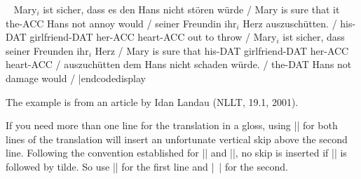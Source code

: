 \begingroup
\codedisplay~
\pex[moregloffset=1em,aboveglhangskip=1ex]\nopreamble
\def\\#1{-{\tenrm #1}}%
\a
\begingl
\gla Mary$_i$ ist sicher, dass es den Hans nicht st\"oren w\"urde /
\glb Mary is sure that it the\\{ACC} Hans not annoy would /
\moregl
\gla seiner Freundin ihr$_i$ Herz auszusch\"utten. /
\glb his\\{DAT} girlfriend\\{DAT} her\\{ACC} heart\\{ACC}
{out to throw} /
\endgl
\a
\begingl
\gla Mary$_i$ ist sicher, dass seiner Freunden ihr$_i$ Herz /
\glb Mary is sure that his\\{DAT} girlfriend\\{DAT} her\\{ACC}
heart\\{ACC} /
\moregl
\gla auszuch\"utten dem Hans nicht schaden w\"urde. /
 the\\{DAT} Hans not damage would /
\endgl
\xe |endcodedisplay
\endgroup

\noindent The example is from an article by Idan Landau (NLLT,
19.1, 2001).

If you need more than one line for the translation in a gloss,
using |\glc| for both lines of the translation will insert an
unfortunate vertical skip above the second line.
Following the convention established for |\ex| and |\pex|, no
skip is inserted if |\glc| is followed by tilde.  So use |\glc|
for the first line and |\glc~| for the second.


